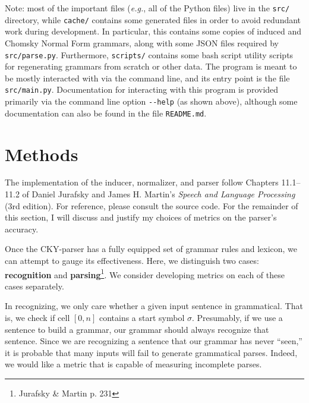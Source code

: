 \documentclass[paper=a4, fontsize=11pt]{scrartcl} %
\begin{document}
Note: most of the important files (\textit{e.g.}, all of the Python files) live in the \texttt{src/} directory, while \texttt{cache/} contains some generated files in order to avoid redundant work during development.  In particular, this contains some copies of induced and Chomsky Normal Form grammars, along with some JSON files required by \texttt{src/parse.py}.  Furthermore, \texttt{scripts/} contains some bash script utility scripts for regenerating grammars from scratch or other data.  The program is meant to be mostly interacted with via the command line, and its entry point is the file \texttt{src/main.py}.  Documentation for interacting with this program is provided primarily via the command line option \texttt{{-}{-}help} (as shown above), although some documentation can also be found in the file \texttt{README.md}.

\section*{Methods}

The implementation of the inducer, normalizer, and parser follow Chapters 11.1--11.2 of Daniel Jurafsky and James H. Martin's \textit{Speech and Language Processing} (3rd edition).  For reference, please consult the source code.  For the remainder of this section, I will discuss and justify my choices of metrics on the parser's accuracy.

Once the CKY-parser has a fully equipped set of grammar rules and lexicon, we can attempt to gauge its effectiveness.  Here, we distinguish two cases: \textbf{recognition} and \textbf{parsing}\footnote{Jurafsky \& Martin p. 231}.  We consider developing metrics on each of these cases separately.

In recognizing, we only care whether a given input sentence in grammatical.  That is, we check if cell $[0,n]$ contains a start symbol $\sigma$.  Presumably, if we use a sentence to build a grammar, our grammar should always recognize that sentence.  Since we are recognizing a sentence that our grammar has never ``seen,'' it is probable that many inputs will fail to generate grammatical parses.  Indeed, we would like a metric that is capable of measuring incomplete parses.
\end{document}
